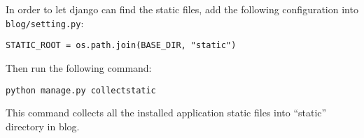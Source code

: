 In order to let django can find the static files,
add the following configuration into \verb|blog/setting.py|:
\begin{lstlisting}
STATIC_ROOT = os.path.join(BASE_DIR, "static")
\end{lstlisting}

Then run the following command:
\lstset{language=Sh}
\begin{lstlisting}
python manage.py collectstatic  
\end{lstlisting}
This command collects all the installed application static files into ``static'' directory in blog.



